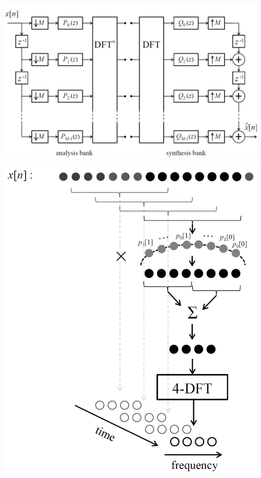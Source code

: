 \begin{minipage}{.6\textwidth}
	\includegraphics[width=\textwidth]{./images/dft_filterbank}
\end{minipage}
\begin{minipage}{.4\textwidth}
	\includegraphics[width=\textwidth]{./images/dft_filter_ill}
\end{minipage}